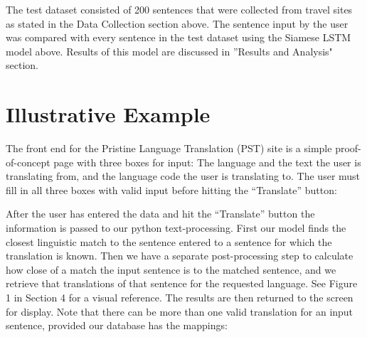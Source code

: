 \documentclass[runningheads]{llncs}
\begin{document}
	The test dataset consisted of 200 sentences that were collected from travel sites as stated in the Data Collection section above. The sentence input by the user was compared with every sentence in the test dataset using the Siamese LSTM model above.	Results of this model are discussed in ''Results and Analysis" section.
	
	\section{Illustrative Example}
	The front end for the Pristine Language Translation (PST) site is a simple proof-of-concept page with three boxes for input: The language and the text the user is translating from, and the language code the user is translating to. The user must fill in all three boxes with valid input before hitting the ``Translate'' button:

	\begin{minipage}{\linewidth}
		\begin{center}
  			 \noindent{}
			\label{fig:Language Input}
		\end{center}
	\end{minipage}

After the user has entered the data and hit the ``Translate'' button the information is passed to our python text-processing. First our model finds the closest linguistic match to the sentence entered to a sentence for which the translation is known. Then we have a separate post-processing step to calculate how close of a match the input sentence is to the matched sentence, and we retrieve that translations of that sentence for the requested language. See Figure 1 in Section 4 for a visual reference.
The results are then returned to the screen for display. Note that there can be more than one valid translation for an input sentence, provided our database has the mappings:
\end{document}
